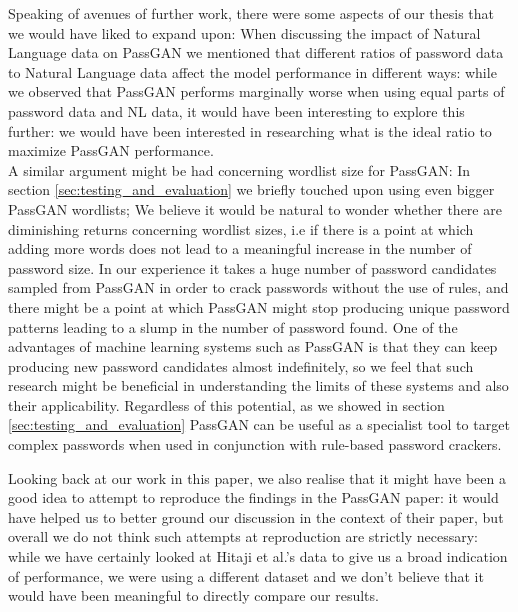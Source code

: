 Speaking of avenues of further work, there were some aspects of our thesis that we would have liked to expand upon:
When discussing the impact of Natural Language data on PassGAN we mentioned that different ratios of password data to Natural Language data affect the model performance in different ways: while we observed that PassGAN performs marginally worse when using equal parts of password data and NL data, it would have been interesting to explore this further: we would have been interested in researching what is the ideal ratio to maximize PassGAN performance. \\
A similar argument might be had concerning wordlist size for PassGAN: In section \ref{sec:testing_and_evaluation} we briefly touched upon using even bigger PassGAN wordlists; We believe it would be natural to wonder whether there are diminishing returns concerning wordlist sizes, i.e if there is a point at which adding more words does not lead to a meaningful increase in the number of password size.
In our experience it takes a huge number of password candidates sampled from PassGAN in order to crack passwords without the use of rules, and there might be a point at which PassGAN might stop producing unique password patterns leading to a slump in the number of password found. One of the advantages of machine learning systems such as PassGAN is that they can keep producing new password candidates almost indefinitely, so we feel that such research might be beneficial in understanding the limits of these systems and also their applicability. Regardless of this potential, as we showed in section \ref{sec:testing_and_evaluation} PassGAN can be useful as a specialist tool to target complex passwords when used in conjunction with rule-based password crackers.

Looking back at our work in this paper, we also realise that it might have been a good idea to attempt to reproduce the findings in the PassGAN paper: it would have helped us to better ground our discussion in the context of their paper, but overall we do not think such attempts at reproduction are strictly necessary: while we have certainly looked at Hitaji et al.'s data to give us a broad indication of performance, we were using a different dataset and we don't believe that it would have been meaningful to directly compare our results.

  
